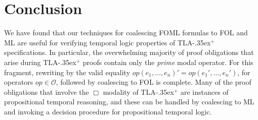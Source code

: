 \documentclass[a4paper,fleqn,envcountsame,orivec]{llncs}
\newcommand{\tlaplus}{\mbox{TLA\kern -.35ex$^+$}\xspace}
\newcommand{\OO}{\mathcal{O}}
\newcommand{\edmargin}[2]{\marginpar{\raggedright\footnotesize\color{red}#1: #2}}
\newcommand{\edmargin}[2]{}
\def\smmargin{\edmargin{SM}}
\begin{document}
\section{Conclusion}
\label{sec:conclusion}


We have found that our techniques for coalescing FOML formulas to
FOL and ML are useful for verifying temporal logic properties of
\tlaplus specifications. In particular, the overwhelming majority of proof
obligations that arise during \tlaplus proofs
contain only the \emph{prime} modal operator. For this fragment,
rewriting by the valid equality $op(e_1,\ldots,e_n)' = op(e_1',\ldots,e_n')$, for
operators $op \in \OO$, followed by coalescing to FOL is complete. Many of the
proof obligations that involve the $\Box$ modality of \tlaplus are instances of
propositional temporal reasoning, and these can be handled by coalescing to
ML and invoking a decision procedure for propositional temporal logic.
\end{document}
